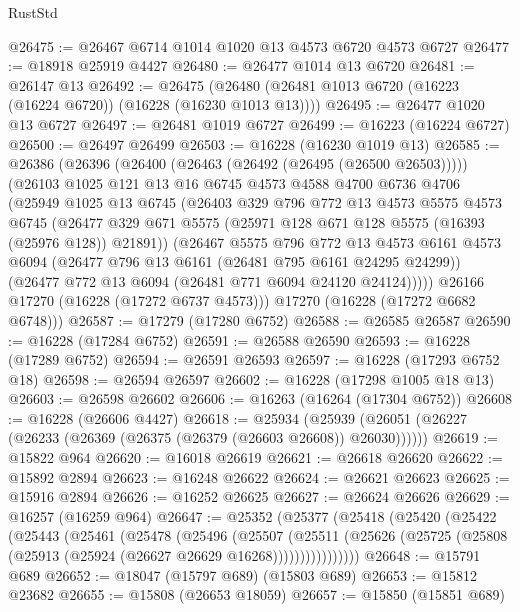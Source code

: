 \begin{lexlean}{RustStd}
\begin{coremodule}
@26475 := @26467 @6714 @1014 @1020 @13 @4573 @6720 @4573 @6727
@26477 := @18918 @25919 @4427
@26480 := @26477 @1014 @13 @6720
@26481 := @26147 @13
@26492 := @26475 (@26480 (@26481 @1013 @6720 (@16223 (@16224 @6720)) (@16228 (@16230 @1013 @13))))
@26495 := @26477 @1020 @13 @6727
@26497 := @26481 @1019 @6727
@26499 := @16223 (@16224 @6727)
@26500 := @26497 @26499
@26503 := @16228 (@16230 @1019 @13)
@26585 := @26386
    (@26396
      (@26400 (@26463 (@26492 (@26495 (@26500 @26503)))))
      (@26103
        @1025
        @121
        @13
        @16
        @6745
        @4573
        @4588
        @4700
        @6736
        @4706
        (@25949
          @1025
          @13
          @6745
          (@26403
            @329
            @796
            @772
            @13
            @4573
            @5575
            @4573
            @6745
            (@26477 @329 @671 @5575 (@25971 @128 @671 @128 @5575 (@16393 (@25976 @128)) @21891))
            (@26467
              @5575
              @796
              @772
              @13
              @4573
              @6161
              @4573
              @6094
              (@26477 @796 @13 @6161 (@26481 @795 @6161 @24295 @24299))
              (@26477 @772 @13 @6094 (@26481 @771 @6094 @24120 @24124)))))
        @26166
        @17270
        (@16228 (@17272 @6737 @4573)))
      @17270
      (@16228 (@17272 @6682 @6748)))
@26587 := @17279 (@17280 @6752)
@26588 := @26585 @26587
@26590 := @16228 (@17284 @6752)
@26591 := @26588 @26590
@26593 := @16228 (@17289 @6752)
@26594 := @26591 @26593
@26597 := @16228 (@17293 @6752 @18)
@26598 := @26594 @26597
@26602 := @16228 (@17298 @1005 @18 @13)
@26603 := @26598 @26602
@26606 := @16263 (@16264 (@17304 @6752))
@26608 := @16228 (@26606 @4427)
@26618 := @25934
    (@25939 (@26051 (@26227 (@26233 (@26369 (@26375 (@26379 (@26603 @26608)) @26030))))))
@26619 := @15822 @964
@26620 := @16018 @26619
@26621 := @26618 @26620
@26622 := @15892 @2894
@26623 := @16248 @26622
@26624 := @26621 @26623
@26625 := @15916 @2894
@26626 := @16252 @26625
@26627 := @26624 @26626
@26629 := @16257 (@16259 @964)
@26647 := @25352
    (@25377
      (@25418
        (@25420
          (@25422
            (@25443
              (@25461
                (@25478
                  (@25496
                    (@25507
                      (@25511
                        (@25626
                          (@25725 (@25808 (@25913 (@25924 (@26627 @26629 @16268))))))))))))))))
@26648 := @15791 @689
@26652 := @18047 (@15797 @689) (@15803 @689)
@26653 := @15812 @23682
@26655 := @15808 (@26653 @18059)
@26657 := @15850 (@15851 @689)

\end{coremodule}
\end{lexlean}
